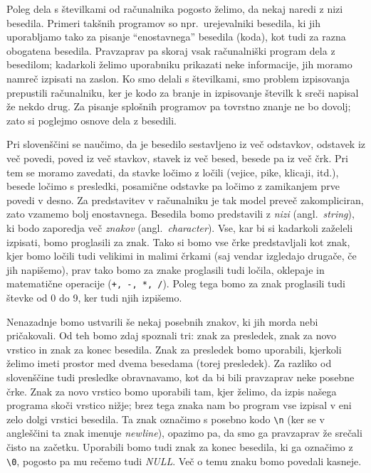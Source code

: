 \documentclass{book}
\begin{document}
Poleg dela s številkami od računalnika pogosto želimo, da nekaj naredi z nizi
besedila.
Primeri takšnih programov so npr.~urejevalniki besedila, ki jih uporabljamo tako
za pisanje ``enostavnega'' besedila (koda), kot tudi za razna obogatena
besedila.
Pravzaprav pa skoraj vsak računalniški program dela z besedilom; kadarkoli
želimo uporabniku prikazati neke informacije, jih moramo namreč izpisati na
zaslon.
Ko smo delali s številkami, smo problem izpisovanja prepustili računalniku, ker
je kodo za branje in izpisovanje številk k sreči napisal že nekdo drug.
Za pisanje splošnih programov pa tovrstno znanje ne bo dovolj; zato si poglejmo
osnove dela z besedili.

Pri slovenščini se naučimo, da je besedilo sestavljeno iz več odstavkov,
odstavek iz več povedi, poved iz več stavkov, stavek iz več besed, besede pa iz
več črk.
Pri tem se moramo zavedati, da stavke ločimo z ločili (vejice, pike, klicaji,
itd.), besede ločimo s presledki, posamične odstavke pa ločimo z zamikanjem prve
povedi v desno.
Za predstavitev v računalniku je tak model preveč zakompliciran, zato vzamemo
bolj enostavnega.
Besedila bomo predstavili z \textit{nizi} (angl.~\textit{string}), ki bodo
zaporedja več \textit{znakov} (angl.~\textit{character}).
Vse, kar bi si kadarkoli zaželeli izpisati, bomo proglasili za znak.
Tako si bomo vse črke predstavljali kot znak, kjer bomo ločili tudi velikimi in
malimi črkami (saj vendar izgledajo drugače, če jih napišemo), prav tako bomo za
znake proglasili tudi ločila, oklepaje in matematične operacije
(\verb|+, -, *, /|).
Poleg tega bomo za znak proglasili tudi števke od 0 do 9, ker tudi njih
izpišemo.

Nenazadnje bomo ustvarili še nekaj posebnih znakov, ki jih morda nebi
pričakovali.
Od teh bomo zdaj spoznali tri: znak za presledek, znak za novo vrstico in znak
za konec besedila.
Znak za presledek bomo uporabili, kjerkoli želimo imeti prostor med dvema
besedama (torej presledek).
Za razliko od slovenščine tudi presledke obravnavamo, kot da bi bili pravzaprav
neke posebne črke.
Znak za novo vrstico bomo uporabili tam, kjer želimo, da izpis našega programa
skoči vrstico nižje; brez tega znaka nam bo program vse izpisal v eni zelo dolgi
vrstici besedila.
Ta znak označimo s posebno kodo \verb+\n+ (ker se v angleščini ta znak imenuje
\textit{newline}), opazimo pa, da smo ga pravzaprav že srečali čisto na začetku.
Uporabili bomo tudi znak za konec besedila, ki ga označimo z \verb+\0+,
pogosto pa mu rečemo tudi \textit{NULL}.
Več o temu znaku bomo povedali kasneje.
\end{document}
